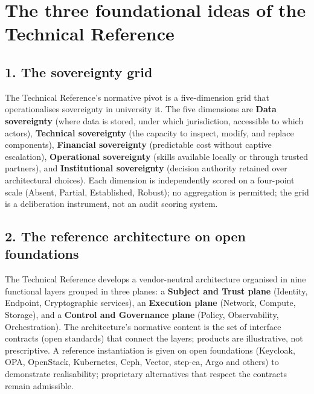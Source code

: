 \documentclass[11pt,a4paper,twoside]{book}
\newcommand{\keyword}[1]{\textbf{#1}}
\begin{document}
\medskip

\section*{The three foundational ideas of the Technical Reference}

\subsection*{1. The sovereignty grid}

The Technical Reference's normative pivot is a five-dimension grid
that operationalises sovereignty in university \gls{it}. The five
dimensions are \keyword{Data sovereignty} (where data is stored,
under which jurisdiction, accessible to which actors),
\keyword{Technical sovereignty} (the capacity to inspect, modify,
and replace components), \keyword{Financial sovereignty}
(predictable cost without captive escalation),
\keyword{Operational sovereignty} (skills available locally or
through trusted partners), and \keyword{Institutional sovereignty}
(decision authority retained over architectural choices). Each
dimension is independently scored on a four-point scale (Absent,
Partial, Established, Robust); no aggregation is permitted; the
grid is a deliberation instrument, not an audit scoring system.

\subsection*{2. The reference architecture on open foundations}

The Technical Reference develops a vendor-neutral architecture
organised in nine functional layers grouped in three planes: a
\keyword{Subject and Trust plane} (Identity, Endpoint,
Cryptographic services), an \keyword{Execution plane} (Network,
Compute, Storage), and a \keyword{Control and Governance plane}
(Policy, Observability, Orchestration). The architecture's
normative content is the set of interface contracts (open
standards) that connect the layers; products are illustrative,
not prescriptive. A reference instantiation is given on open
foundations (Keycloak, OPA, OpenStack, Kubernetes, Ceph, Vector,
step-ca, Argo and others) to demonstrate realisability;
proprietary alternatives that respect the contracts remain
admissible.
\end{document}
